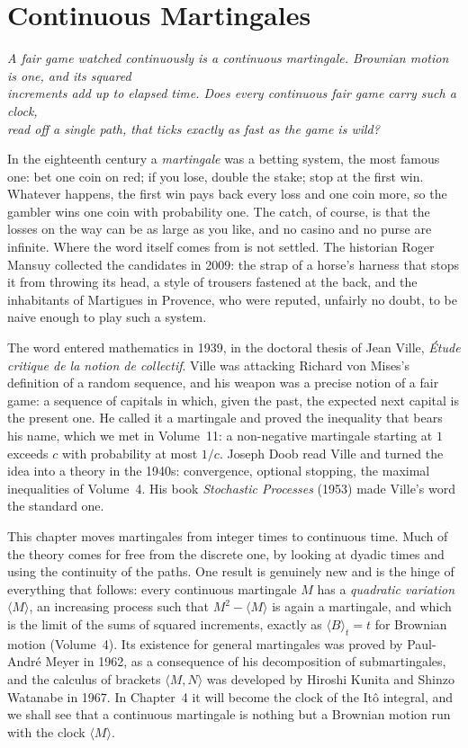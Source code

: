 \chapter{Continuous Martingales}

\begin{center}\itshape
A fair game watched continuously is a continuous martingale. Brownian motion is one, and its squared\\
increments add up to elapsed time. Does every continuous fair game carry such a clock,\\
read off a single path, that ticks exactly as fast as the game is wild?
\end{center}

In the eighteenth century a \emph{martingale} was a betting system, the most famous one: bet one coin on red; if you lose, double the stake; stop at the first win. Whatever happens, the first
win pays back every loss and one coin more, so the gambler wins one coin with probability one. The catch, of course, is that the losses on the way can be as large as you like, and no
casino and no purse are infinite. Where the word itself comes from is not settled. The historian Roger Mansuy collected the candidates in 2009: the strap of a horse's harness that stops it
from throwing its head, a style of trousers fastened at the back, and the inhabitants of Martigues in Provence, who were reputed, unfairly no doubt, to be naive enough to play such a system.

The word entered mathematics in 1939, in the doctoral thesis of Jean Ville, \emph{\'Etude critique de la notion de collectif}. Ville was attacking Richard von Mises's definition of a random
sequence, and his weapon was a precise notion of a fair game: a sequence of capitals in which, given the past, the expected next capital is the present one. He called it a martingale and
proved the inequality that bears his name, which we met in Volume~11: a non-negative martingale starting at $1$ exceeds $c$ with probability at most $1/c$. Joseph Doob read Ville and
turned the idea into a theory in the 1940s: convergence, optional stopping, the maximal inequalities of Volume~4. His book \emph{Stochastic Processes} (1953) made Ville's word the standard one.

This chapter moves martingales from integer times to continuous time. Much of the theory comes for free from the discrete one, by looking at dyadic times and using the continuity of the
paths. One result is genuinely new and is the hinge of everything that follows: every continuous martingale $M$ has a \emph{quadratic variation} $\langle M\rangle$, an increasing process such
that $M^2-\langle M\rangle$ is again a martingale, and which is the limit of the sums of squared increments, exactly as $\langle B\rangle_t=t$ for Brownian motion (Volume~4). Its existence
for general martingales was proved by Paul-Andr\'e Meyer in 1962, as a consequence of his decomposition of submartingales, and the calculus of brackets $\langle M,N\rangle$ was developed by
Hiroshi Kunita and Shinzo Watanabe in 1967. In Chapter~4 it will become the clock of the It\^o integral, and we shall see that a continuous martingale is nothing but a Brownian motion run with
the clock $\langle M\rangle$.

